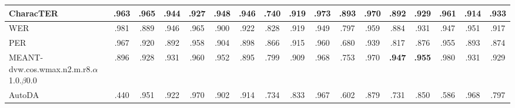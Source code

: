 \begin{landscape}
\begin{table}
\begin{tabular}{m{}cccccccc|cccccccc}
CharacTER & .963  & .965  & .944  & .927  & .948  & .946  & .740  & .919  & \textbf{.973 } & \textbf{.893 } & .970  & .892  & .929  & .961  & .914  & .933 \\ \hline
WER & .981  & .889  & .946  & .965  & .900  & .922  & .828  & .919  & .949  & .797  & .959  & .884  & .931  & .947  & .951  & .917  \\ \hline
PER & .967  & .920  & .892  & .958  & .904  & .898  & .866  & .915  & .960  & .680  & .939  & .817  & .876  & .955  & .893  & .874  \\ \hline
MEANT-dvw.cos.wmax.n2.m.r8.$\alpha $1.0.$\beta $0.0 & .896  & .928  & .931  & .960  & .952  & .895  & .799  & .909  & .968  & .753  & .970  & \textbf{.947 } & \textbf{.955 } & .980  & .931  & .929  \\ \hline
AutoDA & .440  & .951  & .922  & .970  & .902  & .914  & .734  & .833  & .967  & .602  & .879  & .731  & .850  & .586  & .968  & .797  \\ \hline
\end{tabular}
\label{tbl_wmt17-sys}
\end{table}
\end{landscape} 
